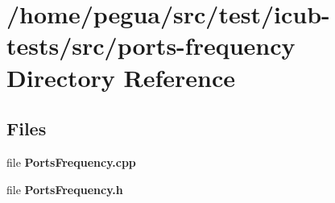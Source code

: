 \section{/home/pegua/src/test/icub-\/tests/src/ports-\/frequency Directory Reference}
\label{dir_d6cc1804077fb7a0bee471bebe09c948}
\subsection*{Files}
\begin{DoxyCompactItemize}
\item 
file {\bfseries Ports\-Frequency.\-cpp}
\item 
file {\bfseries Ports\-Frequency.\-h}
\end{DoxyCompactItemize}
